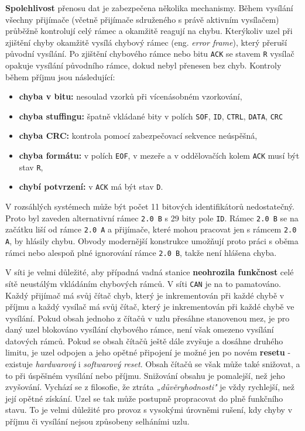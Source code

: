         \textbf{Spolehlivost} přenosu dat je zabezpečena několika mechanismy. Během vysílání 
        všechny přijímače (včetně přijímače sdruženého s právě aktivním vysílačem) průběžně 
        kontrolují celý rámec a okamžitě reagují na chybu. Kterýkoliv uzel při zjištění chyby 
        okamžitě vysílá chybový rámec (eng. \emph{error frame}), který přeruší původní vysílání. Po 
        zjištění chybového rámce nebo bitu \texttt{ACK} se stavem \texttt{R} vysílač opakuje 
        vysílání původního rámce, dokud nebyl přenesen bez 
        chyb. Kontroly během příjmu jsou následující:
        \begin{itemize}\addtolength{\itemsep}{-0.5\baselineskip}
          \item \textbf{chyba v bitu:} nesoulad vzorků při vícenásobném vzorkování,
          \item \textbf{chyba stuffingu:} špatně vkládané bity v polích \texttt{SOF}, \texttt{ID}, 
                \texttt{CTRL}, \texttt{DATA}, \texttt{CRC}
          \item \textbf{chyba CRC:} kontrola pomocí zabezpečovací sekvence neúspěšná,
          \item \textbf{chyba formátu:} v polích \texttt{EOF}, v mezeře a v oddělovačích kolem  
                \texttt{ACK} musí být stav \texttt{R},
          \item \textbf{chybí potvrzení:} v \texttt{ACK} má být stav \texttt{D}.          
        \end{itemize}
        
        V rozsáhlých systémech může být počet 11 bitových identifikátorů nedostatečný. Proto byl 
        zaveden alternativní rámec \texttt{2.0 B} s 29 bity pole \texttt{ID}. Rámec \texttt{2.0 B} 
        se na začátku liší od rámce \texttt{2.0 A} a přijímače, které mohou pracovat jen s rámcem 
        \texttt{2.0 A}, by hlásily chybu. Obvody modernější konstrukce umožňují proto práci s oběma 
        rámci nebo alespoň plné ignorování rámce \texttt{2.0 B}, takže není hlášena chyba.
        
        V síti je velmi důležité, aby případná vadná stanice \textbf{neohrozila funkčnost} celé 
        sítě neustálým vkládáním chybových rámců. V síti \texttt{CAN} je na to pamatováno. Každý 
        přijímač má svůj čítač chyb, který je inkrementován při každé chybě v příjmu a každý 
        vysílač má svůj čítač, který je inkrementován při každé chybě ve vysílání. Pokud obsah 
        jednoho z čítačů v uzlu přesáhne stanovenou mez, je pro daný uzel blokováno vysílání 
        chybového rámce, není však omezeno vysílání datových rámců. Pokud se obsah čítačů ještě 
        dále zvyšuje a dosáhne druhého limitu, je uzel odpojen a jeho opětné připojení je možné jen 
        po novém \textbf{resetu} - existuje \emph{hardwarový} i \emph{softwarový reset}. Obsah 
        čítačů se však může také snižovat, a to při úspěšném vysílání nebo příjmu. Snižování 
        obsahu je pomalejší, než jeho zvyšování. Vychází se z filosofie, že ztráta 
        \emph{„důvěryhodnosti"} je vždy rychlejší, než její opětné získání. Uzel se tak může 
        postupně propracovat do plně funkčního stavu. To je velmi důležité pro provoz s vysokými 
        úrovněmi rušení, kdy chyby v příjmu či vysílání nejsou způsobeny selháními uzlu.
        

